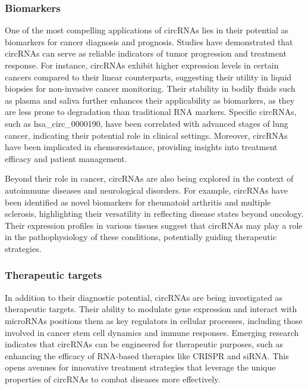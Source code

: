 \subsubsection{Biomarkers}
One of the most compelling applications of circRNAs lies in their potential as
biomarkers for cancer diagnosis and prognosis.
Studies have demonstrated that circRNAs can serve as reliable indicators of
tumor progression and treatment response.
For instance, circRNAs exhibit higher expression levels in certain cancers
compared to their linear counterparts, suggesting their utility in liquid
biopsies for non-invasive cancer
monitoring\supercite{bao_prognostic_2020,ren_construction_2017}.
Their stability in bodily fluids such as plasma and saliva further enhances
their applicability as biomarkers, as they are less prone to degradation than
traditional RNA markers\supercite{bao_prognostic_2020,zhang_circular_2018}.
Specific circRNAs, such as hsa\_circ\_0000190, have been correlated with
advanced stages of lung cancer, indicating their potential role in clinical
settings\supercite{luo_plasma_2020}.
Moreover, circRNAs have been implicated in chemoresistance, providing insights
into treatment efficacy and patient
management\supercite{geng_function_2018,feng_functions_2019}.

Beyond their role in cancer, circRNAs are also being explored in the context of
autoimmune diseases and neurological disorders.
For example, circRNAs have been identified as novel biomarkers for rheumatoid
arthritis and multiple sclerosis, highlighting their versatility in reflecting
disease states beyond
oncology\supercite{ouyang_identification_2021,he_exosomal_2019}.
Their expression profiles in various tissues suggest that circRNAs may play a
role in the pathophysiology of these conditions, potentially guiding
therapeutic strategies\supercite{mohammed_circular_2023}.

\subsubsection{Therapeutic targets}
In addition to their diagnostic potential, circRNAs are being investigated as
therapeutic targets.
Their ability to modulate gene expression and interact with microRNAs positions
them as key regulators in cellular processes, including those involved in
cancer stem cell dynamics and immune responses\supercite{cheng_emerging_2023}.
Emerging research indicates that circRNAs can be engineered for therapeutic
purposes, such as enhancing the efficacy of RNA-based therapies like CRISPR and
siRNA\supercite{wesselhoeft_engineering_2018}.
This opens avenues for innovative treatment strategies that leverage the unique
properties of circRNAs to combat diseases more effectively.
